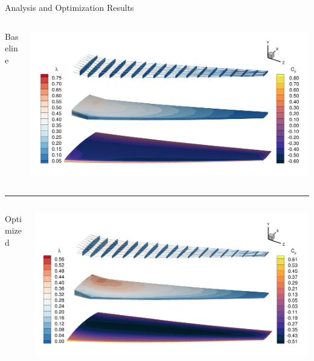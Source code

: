 \documentclass{bredelebeamer}
\begin{document}
\begin{frame}{Analysis and Optimization Results}
  \begin{columns}
    \begin{column}{0.3\textwidth}
      \begin{center}
        Baseline
      \end{center}
    \end{column}
    \begin{column}{0.7\textwidth}
      \includegraphics[width=1.0\linewidth]{images/aerostruct-resultAnalysis.png}
    \end{column}
  \end{columns}
  \noindent\rule{\textwidth}{1pt}
  \begin{columns}
    \begin{column}{0.3\textwidth}
      \begin{center}
        Optimized
      \end{center}
    \end{column}
    \begin{column}{0.7\textwidth}
      \includegraphics[width=1.0\linewidth]{images/aerostruct-resultOpt.png}
    \end{column}
  \end{columns}
\end{frame}
\end{document}
